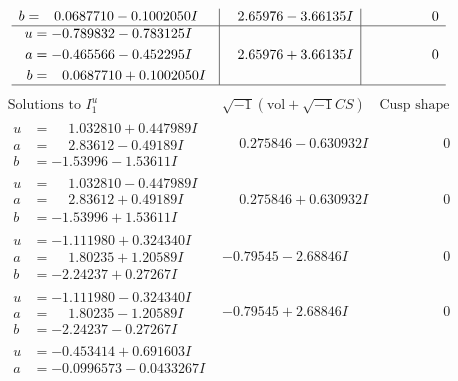 \documentclass[1p]{elsarticle_modified}
\theoremstyle{definition}
\newcommand{\I}{\sqrt{-1}}
\begin{document}
$$\begin{array}{c|c|c}
\begin{aligned}
b &= \phantom{-}0.0687710 - 0.1002050 I\end{aligned}
 & \phantom{-}2.65976 - 3.66135 I & \phantom{-0.000000 } 0 \\ \hline\begin{aligned}
u &= -0.789832 - 0.783125 I \\
a &= -0.465566 - 0.452295 I \\
b &= \phantom{-}0.0687710 + 0.1002050 I\end{aligned}
 & \phantom{-}2.65976 + 3.66135 I & \phantom{-0.000000 } 0\\
 \hline 
 \end{array}$$\newpage$$\begin{array}{c|c|c}  
\text{Solutions to }I^u_{1}& \I (\text{vol} + \sqrt{-1}CS) & \text{Cusp shape}\\
 \hline 
\begin{aligned}
u &= \phantom{-}1.032810 + 0.447989 I \\
a &= \phantom{-}2.83612 - 0.49189 I \\
b &= -1.53996 - 1.53611 I\end{aligned}
 & \phantom{-}0.275846 - 0.630932 I & \phantom{-0.000000 } 0 \\ \hline\begin{aligned}
u &= \phantom{-}1.032810 - 0.447989 I \\
a &= \phantom{-}2.83612 + 0.49189 I \\
b &= -1.53996 + 1.53611 I\end{aligned}
 & \phantom{-}0.275846 + 0.630932 I & \phantom{-0.000000 } 0 \\ \hline\begin{aligned}
u &= -1.111980 + 0.324340 I \\
a &= \phantom{-}1.80235 + 1.20589 I \\
b &= -2.24237 + 0.27267 I\end{aligned}
 & -0.79545 - 2.68846 I & \phantom{-0.000000 } 0 \\ \hline\begin{aligned}
u &= -1.111980 - 0.324340 I \\
a &= \phantom{-}1.80235 - 1.20589 I \\
b &= -2.24237 - 0.27267 I\end{aligned}
 & -0.79545 + 2.68846 I & \phantom{-0.000000 } 0 \\ \hline\begin{aligned}
u &= -0.453414 + 0.691603 I \\
a &= -0.0996573 - 0.0433267 I \\

\end{aligned}
\end{array}$$
\end{document}
